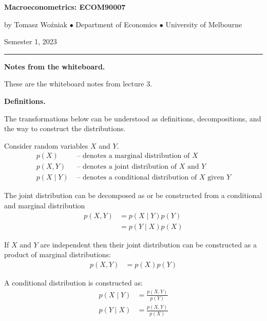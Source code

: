 \documentclass[10pt]{article}
\begin{document}


\bigskip\noindent\textbf{\LARGE Macroeconometrics: ECOM90007}

\smallskip\noindent by Tomasz Wo\'zniak $\bullet$ Department of Economics $\bullet$  University of Melbourne

\smallskip\noindent Semester 1, 2023

\smallskip\noindent\rule{5cm}{.1pt}

\normalsize
\bigskip\noindent\textbf{\Large Notes from the whiteboard.} 

\smallskip\noindent These are the whiteboard notes from lecture 3.

\bigskip\noindent\textbf{\large Definitions.} 

\smallskip\noindent The transformations below can be understood as definitions, decompositions, and the way to construct the distributions.


\smallskip\noindent Consider random variables $X$ and $Y$. 
\begin{align*}
p(X) &\text{ -- denotes a marginal distribution of } X \\
p(X,Y) &\text{ -- denotes a joint distribution of } X \text{ and } Y\\
p(X\mid Y) &\text{ -- denotes a conditional distribution of } X \text{ given } Y
\end{align*}


\smallskip\noindent The joint distribution can be decomposed as or be constructed from a conditional and marginal distribution
\begin{align*}
p(X,Y) & = p(X\mid Y) p(Y)\\
&= p(Y\mid X)p(X)
\end{align*}

\smallskip\noindent If $X$ and $Y$ are independent then their joint distribution can be constructed as a product of marginal distributions:
\begin{align*}
p(X,Y) & = p(X) p(Y)
\end{align*}

\smallskip\noindent A conditional distribution is constructed as:
\begin{align*}
p(X\mid Y) & = \frac{p(X, Y)}{p(Y)}\\
p(Y\mid X) & = \frac{p(X, Y)}{p(X)}
\end{align*}
\end{document}
